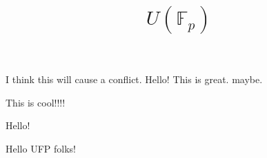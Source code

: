 \documentclass{amsart}
\begin{document}
I think this will cause a conflict. 
 Hello! This is great. maybe. 

This is cool!!!!

    \title{$U(\mathbb{F}_p)$}



    \maketitle

 Hello!

 Hello UFP folks!
\end{document}
